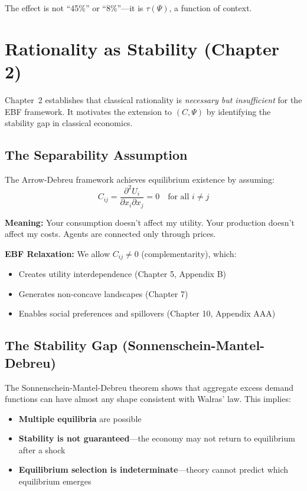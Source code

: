 The effect is not ``45\%'' or ``8\%''---it is $\tau(\Psi)$, a function of context.

\section{Rationality as Stability (Chapter 2)}
\label{sec:mp-rationality}

Chapter~2 establishes that classical rationality is \textit{necessary but insufficient}
for the EBF framework. It motivates the extension to $(C, \Psi)$ by identifying
the stability gap in classical economics.

\subsection{The Separability Assumption}

The Arrow-Debreu framework achieves equilibrium existence by assuming:
\begin{equation}
\boxed{
C_{ij} = \frac{\partial^2 U_i}{\partial x_i \partial x_j} = 0 \quad \text{for all } i \neq j
}
\label{eq:mp-separability}
\end{equation}

\textbf{Meaning:} Your consumption doesn't affect my utility. Your production doesn't
affect my costs. Agents are connected only through prices.

\textbf{EBF Relaxation:} We allow $C_{ij} \neq 0$ (complementarity), which:
\begin{itemize}
\item Creates utility interdependence (Chapter 5, Appendix B)
\item Generates non-concave landscapes (Chapter 7)
\item Enables social preferences and spillovers (Chapter 10, Appendix AAA)
\end{itemize}

\subsection{The Stability Gap (Sonnenschein-Mantel-Debreu)}

The Sonnenschein-Mantel-Debreu theorem shows that aggregate excess demand functions
can have almost any shape consistent with Walras' law. This implies:

\begin{itemize}
\item \textbf{Multiple equilibria} are possible
\item \textbf{Stability is not guaranteed}---the economy may not return to equilibrium after a shock
\item \textbf{Equilibrium selection is indeterminate}---theory cannot predict which equilibrium emerges
\end{itemize}

